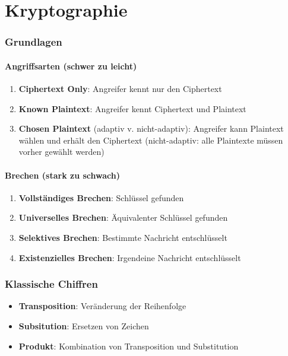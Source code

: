 \documentclass{article}
\author{Leopold Lemmermann}
\begin{document}
\createtitle


\part{Kryptographie}
\section{Grundlagen}
\subsection{Angriffsarten (schwer zu leicht)}
\begin{enumerate}
  \item \textbf{Ciphertext Only}: Angreifer kennt nur den Ciphertext
  \item \textbf{Known Plaintext}: Angreifer kennt Ciphertext und Plaintext
  \item \textbf{Chosen Plaintext} (adaptiv v. nicht-adaptiv): Angreifer kann Plaintext wählen und erhält den Ciphertext (nicht-adaptiv: alle Plaintexte müssen vorher gewählt werden)
\end{enumerate}

\subsection{Brechen (stark zu schwach)}
\begin{enumerate}
  \item \textbf{Vollständiges Brechen}: Schlüssel gefunden
  \item \textbf{Universelles Brechen}: Äquivalenter Schlüssel gefunden
  \item \textbf{Selektives Brechen}: Bestimmte Nachricht entschlüsselt
  \item \textbf{Existenzielles Brechen}: Irgendeine Nachricht entschlüsselt
\end{enumerate}




\section{Klassische Chiffren}
\begin{itemize}
  \item \textbf{Transposition}: Veränderung der Reihenfolge
  \item \textbf{Subsitution}: Ersetzen von Zeichen
  \item \textbf{Produkt}: Kombination von Transposition und Substitution
\end{itemize}
\end{document}
